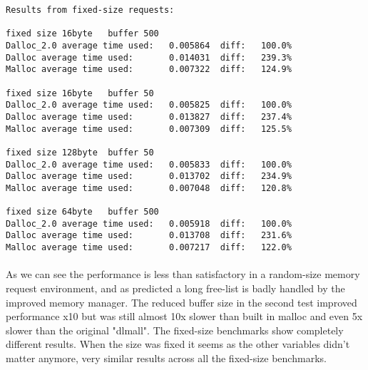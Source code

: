 \documentclass[11pt]{article}
\begin{document}
\begin{verbatim}
Results from fixed-size requests:

fixed size 16byte   buffer 500
Dalloc_2.0 average time used:   0.005864  diff:   100.0%
Dalloc average time used:       0.014031  diff:   239.3%
Malloc average time used:       0.007322  diff:   124.9%

fixed size 16byte   buffer 50
Dalloc_2.0 average time used:   0.005825  diff:   100.0%
Dalloc average time used:       0.013827  diff:   237.4%
Malloc average time used:       0.007309  diff:   125.5%

fixed size 128byte  buffer 50
Dalloc_2.0 average time used:   0.005833  diff:   100.0%
Dalloc average time used:       0.013702  diff:   234.9%
Malloc average time used:       0.007048  diff:   120.8%

fixed size 64byte   buffer 500
Dalloc_2.0 average time used:   0.005918  diff:   100.0%
Dalloc average time used:       0.013708  diff:   231.6%
Malloc average time used:       0.007217  diff:   122.0%
\end{verbatim}

\paragraph{}
As we can see the performance is less than satisfactory in a random-size memory request environment, and as predicted a long free-list is 
badly handled by the improved memory manager. The reduced buffer size in the second test improved performance x10 but was still almost
10x slower than built in malloc and even 5x slower than the original "dlmall". The fixed-size benchmarks show completely different results.
When the size was fixed it seems as the other variables didn't matter anymore, very similar results across all the fixed-size benchmarks.
\end{document}
